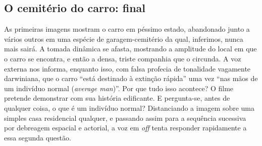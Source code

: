 \begin{multicols}{2}
\section*{O cemitério do carro:\allowbreak{} final}
\par{}As primeiras imagens mostram o carro em péssimo estado,\allowbreak{} abandonado junto a vários outros em uma espécie de garagem-\allowbreak{}cemitério da qual,\allowbreak{} inferimos,\allowbreak{} nunca mais sairá.\allowbreak{} A tomada dinâmica se afasta,\allowbreak{} mostrando a amplitude do local em que o carro se encontra,\allowbreak{} e então a densa,\allowbreak{} triste companhia que o circunda.\allowbreak{} A voz externa nos informa,\allowbreak{} enquanto isso,\allowbreak{} com falsa profecia de tonalidade vagamente darwiniana,\allowbreak{} que o carro “está destinado à extinção rápida” uma vez “nas mãos de um indivíduo normal (\allowbreak{}\textit{average man})\allowbreak{}”.\allowbreak{} Por que tudo isso acontece? O filme pretende demonstrar com sua história edificante.\allowbreak{} E pergunta-\allowbreak{}se,\allowbreak{} antes de qualquer coisa,\allowbreak{} o que é um indivíduo normal? Distanciando a imagem sobre uma simples casa residencial qualquer,\allowbreak{} e passando assim para a sequência sucessiva por debreagem espacial e actorial,\allowbreak{} a voz em \textit{off} tenta responder rapidamente a essa segunda questão.\allowbreak{}

\end{multicols}
